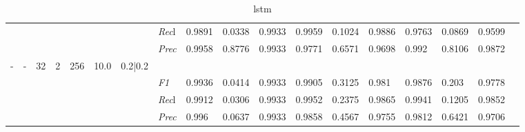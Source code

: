 \begin{table}[]
\begin{tabularx}{\textwidth}{XXXXXXX|X|XXX|XXX|XXXX}
& & & & & & & \textit{Rec}l & 0.9891 & 0.0338 & 0.9933    & 0.9959 & 0.1024    & 0.9886    & 0.9763    & 0.0869    & 0.9599    \\
& & & & & & & \textit{Prec} & 0.9958 & 0.8776 & 0.9933 & 0.9771 & 0.6571 & 0.9698 & 0.992 & 0.8106 & 0.9872 \\ \midrule
- & - & 32 & 2 & 256 &10.0 & 0.2|0.2 & & & & & & & & & \\
& & & & & & & \textit{F1} & 0.9936 & 0.0414 & 0.9933 & 0.9905 & 0.3125        & 0.981        & 0.9876        & 0.203        & 0.9778        \\
& & & & & & & \textit{Rec}l & 0.9912 & 0.0306 & 0.9933    & 0.9952 & 0.2375    & 0.9865    & 0.9941    & 0.1205    & 0.9852    \\
& & & & & & & \textit{Prec} & 0.996 & 0.0637 & 0.9933 & 0.9858 & 0.4567 & 0.9755 & 0.9812 & 0.6421 & 0.9706 \\ \midrule
\end{tabularx}
\caption{lstm}
\label{tab:all_results_lstm}
\end{table}